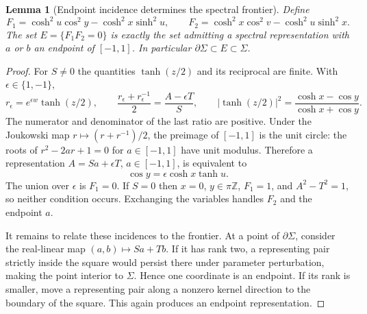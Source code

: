 \documentclass[11pt]{article}
\numberwithin{equation}{section}
\newtheorem{lemma}[theorem]{Lemma}
\theoremstyle{definition}
\begin{document}
\begin{lemma}[Endpoint incidence determines the spectral frontier]
\label{geo:new:endpoint}
Define
\[
 F_1=\cosh^2u\cos^2y-\cosh^2x\sinh^2u,\qquad
 F_2=\cosh^2x\cos^2v-\cosh^2u\sinh^2x.
\]
The set $E=\{F_1F_2=0\}$ is exactly the set admitting a
spectral representation with $a$ or $b$ an endpoint of $[-1,1]$.
In particular $\partial\Sigma\subset E\subset\Sigma$.
\end{lemma}
\begin{proof}
For $S\ne0$ the quantities $\tanh(z/2)$ and its reciprocal
are finite.  With $\epsilon\in\{1,-1\}$,
\[
 r_\epsilon=e^{\epsilon w}\tanh(z/2),\qquad
 \frac{r_\epsilon+r_\epsilon^{-1}}2=\frac{A-\epsilon T}{S},
 \qquad
 |\tanh(z/2)|^2=\frac{\cosh x-\cos y}{\cosh x+\cos y}.
\]
The numerator and denominator of the last ratio are positive.
Under the Joukowski map $r\mapsto(r+r^{-1})/2$, the preimage
of $[-1,1]$ is the unit circle: the roots of $r^2-2ar+1=0$ for
$a\in[-1,1]$ have unit modulus.  Therefore a representation
$A=Sa+\epsilon T$, $a\in[-1,1]$, is equivalent to
\[
 \cos y=\epsilon\cosh x\tanh u.
\]
The union over $\epsilon$ is $F_1=0$.  If $S=0$ then
$x=0$, $y\in\pi\mathbb Z$, $F_1=1$, and $A^2-T^2=1$,
so neither condition occurs.  Exchanging the variables handles
$F_2$ and the endpoint $a$.

It remains to relate these incidences to the frontier. At a point
of $\partial\Sigma$, consider the real-linear map
$(a,b)\mapsto Sa+Tb$.  If it has rank two, a representing pair
strictly inside the square would persist there under parameter
perturbation, making the point interior to $\Sigma$.  Hence
one coordinate is an endpoint.  If its rank is smaller, move a
representing pair along a nonzero kernel direction to the boundary
of the square.  This again produces an endpoint representation.
\end{proof}
\end{document}
